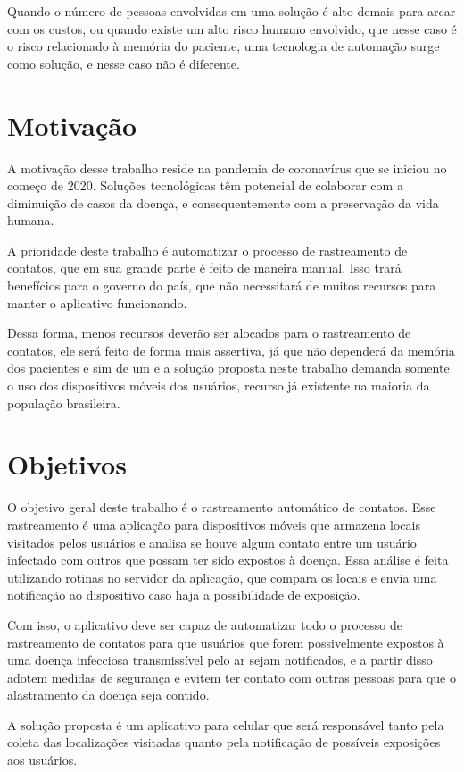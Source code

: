 Quando o número de pessoas envolvidas em uma solução é alto demais para arcar com os custos, ou quando existe um alto risco humano envolvido, que nesse caso é o risco relacionado à memória do paciente, uma tecnologia de automação surge como solução, e nesse caso não é diferente.

\section{Motivação}\label{sec:motivacao}
A motivação desse trabalho reside na pandemia de coronavírus que se iniciou no começo de 2020. Soluções tecnológicas têm potencial de colaborar com a diminuição de casos da doença, e consequentemente com a preservação da vida humana. 

A prioridade deste trabalho é automatizar o processo de rastreamento de contatos, que em sua grande parte é feito de maneira manual. Isso trará benefícios para o governo do país, que não necessitará de muitos recursos para manter o aplicativo funcionando.

Dessa forma, menos recursos deverão ser alocados para o rastreamento de contatos, ele será feito de forma mais assertiva, já que não dependerá da memória dos pacientes e sim de um  e a solução proposta neste trabalho demanda somente o uso dos dispositivos móveis dos usuários, recurso já existente na maioria da população brasileira. 

\section{Objetivos}\label{sec:objetivos}
O objetivo geral deste trabalho é o rastreamento automático de contatos. Esse rastreamento é uma aplicação para dispositivos móveis que armazena locais visitados pelos usuários e analisa se houve algum contato entre um usuário infectado com outros que possam ter sido expostos à doença. Essa análise é feita utilizando rotinas no servidor da aplicação, que compara os locais e envia uma notificação ao dispositivo caso haja a possibilidade de exposição.

Com isso, o aplicativo deve ser capaz de automatizar todo o processo de rastreamento de contatos para que usuários que forem possivelmente expostos à uma doença infecciosa transmissível pelo ar sejam notificados, e a partir disso adotem medidas de segurança e evitem ter contato com outras pessoas para que o alastramento da doença seja contido.

A solução proposta é um aplicativo para celular que será responsável tanto pela coleta das localizações visitadas quanto pela notificação de possíveis exposições aos usuários.

